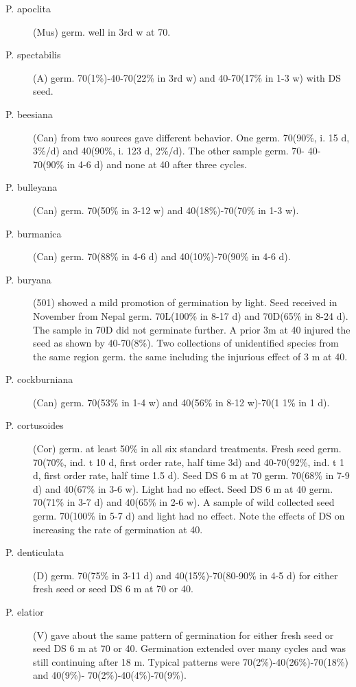 \begin{description}
\item[P. apoclita] (Mus) germ. well in 3rd w at 70.
\item[P. spectabilis] (A) germ. 70(1\%)-40-70(22\% in 3rd w) and 40-70(17\% in 1-3 w)
with DS seed.
\item[P. beesiana] (Can) from two sources gave different behavior. One germ.
70(90\%, i. 15 d, 3\%/d) and 40(90\%, i. 123 d, 2\%/d). The other sample germ. 70-
40-70(90\% in 4-6 d) and none at 40 after three cycles.
\item[P. bulleyana] (Can) germ. 70(50\% in 3-12 w) and 40(18\%)-70(70\% in 1-3 w).
\item[P. burmanica] (Can) germ. 70(88\% in 4-6 d) and 40(10\%)-70(90\% in 4-6 d).
\item[P. buryana] (501) showed a mild promotion of germination by light. Seed
received in November from Nepal germ. 70L(100\% in 8-17 d) and 70D(65\% in 8-24
d). The sample in 70D did not germinate further. A prior 3m at 40 injured the seed as
shown by 40-70(8\%). Two collections of unidentified species from the same region
germ. the same including the injurious effect of 3 m at 40.
\item[P. cockburniana] (Can) germ. 70(53\% in 1-4 w) and 40(56\% in 8-12 w)-70(1 1\%
in 1 d).
\item[P. cortusoides] (Cor) germ. at least 50\% in all six standard treatments. Fresh
seed germ. 70(70\%, ind. t 10 d, first order rate, half time 3d) and 40-70(92\%, ind. t 1 d,
first order rate, half time 1.5 d). Seed DS 6 m at 70 germ. 70(68\% in 7-9 d) and
40(67\% in 3-6 w). Light had no effect. Seed DS 6 m at 40 germ. 70(71\% in 3-7 d) and
40(65\% in 2-6 w). A sample of wild collected seed germ. 70(100\% in 5-7 d) and light
had no effect. Note the effects of DS on increasing the rate of germination at 40.
\item[P. denticulata] (D) germ. 70(75\% in 3-11 d) and 40(15\%)-70(80-90\% in 4-5 d)
for either fresh seed or seed DS 6 m at 70 or 40.
\item[P. elatior] (V) gave about the same pattern of germination for either fresh seed or
seed DS 6 m at 70 or 40. Germination extended over many cycles and was still
continuing after 18 m. Typical patterns were 70(2\%)-40(26\%)-70(18\%) and 40(9\%)-
70(2\%)-40(4\%)-70(9\%).


\end{description}
